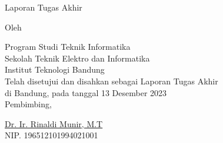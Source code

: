 \clearpage
\pagestyle{empty}

\begin{center}
    \smallskip

    \Large \bfseries \MakeUppercase{\thetitle}
    \vfill

    \Large Laporan Tugas Akhir
    \vfill

    \large Oleh

    \Large \theauthor

    \large Program Studi Teknik Informatika \\

    \normalsize \normalfont
    Sekolah Teknik Elektro dan Informatika \\
    Institut Teknologi Bandung \\

    \vfill
    \normalsize \normalfont
    Telah disetujui dan disahkan sebagai Laporan Tugas Akhir \\
    di Bandung, pada tanggal 13 Desember 2023 \\

    \vspace{0.3cm}
    Pembimbing,

    \vspace{2cm}
    \underline{{{Dr. Ir. Rinaldi Munir, M.T}}} \\
    NIP. {{196512101994021001}}

\end{center}
\clearpage
